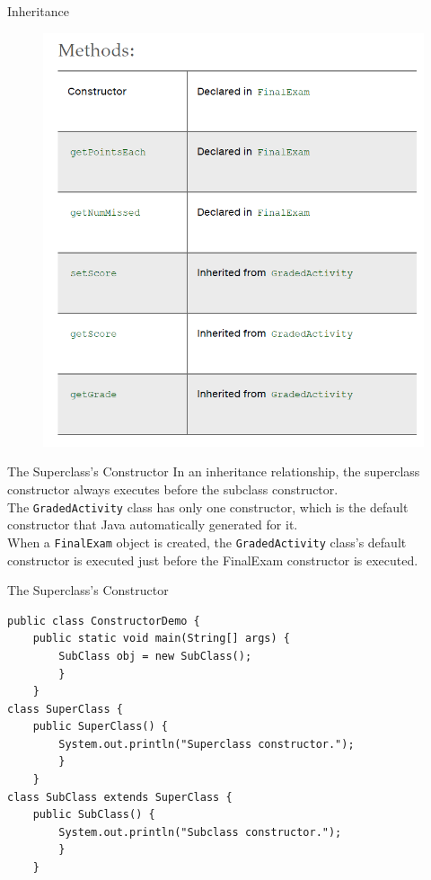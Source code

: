 \documentclass[11pt]{beamer}
\begin{document}
\begin{frame}{Inheritance}
    \noindent 
    \begin{figure}[H]
    \centering
    \includegraphics[scale=0.4]{Images/chapter10_section01_listedFcns.png}
    \end{figure}
\end{frame}

\begin{frame}{The Superclass's Constructor}
    In an inheritance relationship, the superclass constructor always executes before the subclass constructor. \\ \vspace{1em}
    The \texttt{GradedActivity} class has only one constructor, which is the default constructor that Java automatically generated for it. \\ \vspace{1em} 
    When a \texttt{FinalExam} object is created, the \texttt{GradedActivity} class’s default constructor is executed just before the FinalExam constructor is executed.
\end{frame}

\begin{frame}[fragile]{The Superclass's Constructor}
    \begin{lstlisting}
public class ConstructorDemo {
    public static void main(String[] args) {
        SubClass obj = new SubClass();
        }
    }
class SuperClass {
    public SuperClass() {
        System.out.println("Superclass constructor.");
        }
    }
class SubClass extends SuperClass {
    public SubClass() {
        System.out.println("Subclass constructor.");
        }
    }
    \end{lstlisting}    
\end{frame}
\end{document}
